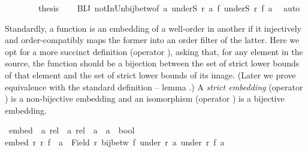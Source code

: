 \begin{isabellebody}
\ \ \isacommand{{\isacharbraceright}{\kern0pt}}\isamarkupfalse%
\isanewline
\ \ \isamarkupfalse%
\ \isamarkupfalse%
\ {\isacharquery}{\kern0pt}thesis\isanewline
\ \ \isamarkupfalse%
\ BIJ\ notIn{\isacharunderscore}{\kern0pt}Un{\isacharunderscore}{\kern0pt}bij{\isacharunderscore}{\kern0pt}betw{\isacharbrackleft}{\kern0pt}of\ a\ {\isachardoublequoteopen}underS\ r\ a{\isachardoublequoteclose}\ f\ {\isachardoublequoteopen}underS\ r{\isacharprime}{\kern0pt}\ {\isacharparenleft}{\kern0pt}f\ a{\isacharparenright}{\kern0pt}{\isachardoublequoteclose}{\isacharbrackright}{\kern0pt}\ \isamarkupfalse%
\ auto\isanewline
{}\isamarkupfalse%
%
\endisatagproof
{\isafoldproof}%
%
\isadelimproof
%
\endisadelimproof
%
\isadelimdocument
%
\endisadelimdocument
%
\isatagdocument
%
\isamarkuptrue%
%
\endisatagdocument
{\isafolddocument}%
%
\isadelimdocument
%
\endisadelimdocument
%
\begin{isamarkuptext}%
Standardly, a function is an embedding of a well-order in another if it injectively and
order-compatibly maps the former into an order filter of the latter.
Here we opt for a more succinct definition (operator ),
asking that, for any element in the source, the function should be a bijection
between the set of strict lower bounds of that element
and the set of strict lower bounds of its image.  (Later we prove equivalence with
the standard definition -- lemma .)
A {\em strict embedding} (operator )  is a non-bijective embedding
and an isomorphism (operator ) is a bijective embedding.%
\end{isamarkuptext}\isamarkuptrue%
\isamarkupfalse%
\ embed\ {\isacharcolon}{\kern0pt}{\isacharcolon}{\kern0pt}\ {\isachardoublequoteopen}{\isacharprime}{\kern0pt}a\ rel\ {\isasymRightarrow}\ {\isacharprime}{\kern0pt}a{\isacharprime}{\kern0pt}\ rel\ {\isasymRightarrow}\ {\isacharparenleft}{\kern0pt}{\isacharprime}{\kern0pt}a\ {\isasymRightarrow}\ {\isacharprime}{\kern0pt}a{\isacharprime}{\kern0pt}{\isacharparenright}{\kern0pt}\ {\isasymRightarrow}\ bool{\isachardoublequoteclose}\isanewline
{}\isanewline
{\isachardoublequoteopen}embed\ r\ r{\isacharprime}{\kern0pt}\ f\ {\isasymequiv}\ {\isasymforall}a\ {\isasymin}\ Field\ r{\isachardot}{\kern0pt}\ bij{\isacharunderscore}{\kern0pt}betw\ f\ {\isacharparenleft}{\kern0pt}under\ r\ a{\isacharparenright}{\kern0pt}\ {\isacharparenleft}{\kern0pt}under\ r{\isacharprime}{\kern0pt}\ {\isacharparenleft}{\kern0pt}f\ a{\isacharparenright}{\kern0pt}{\isacharparenright}{\kern0pt}{\isachardoublequoteclose}\isanewline

\end{isabellebody}
